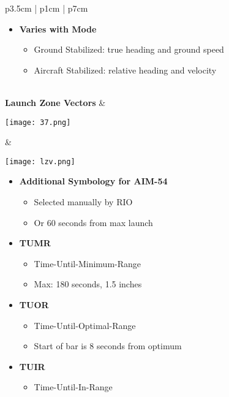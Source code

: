 \documentclass[8pt,usenames,dvipsnames,twoside]{article}
\begin{document}
\begin{center}
\begin{longtable}{p{3.5cm} | p{1cm} | p{7cm}}
\begin{minipage}[t]{\linewidth}
\begin{itemize}
						\item \textbf{Varies with Mode}
						\begin{itemize}
							\item Ground Stabilized: true heading and ground speed
							\item Aircraft Stabilized: relative heading and velocity
						\end{itemize}
					\end{itemize}
				\end{minipage} \\
				\midrule
				\textbf{Launch Zone Vectors} &
				\begin{minipage}[t]{\linewidth}
					\vspace{-7pt}
					\centering
					\texttt{[image: 37.png]}
				\end{minipage} &  
				\begin{minipage}[t]{\linewidth}
					\vspace{-7pt}
					\centering
					\texttt{[image: lzv.png]}
				\end{minipage}
				\begin{minipage}[t]{\linewidth}
					\begin{itemize}
						\item \textbf{Additional Symbology for AIM-54}
						\begin{itemize}
							\item Selected manually by RIO
							\item Or 60 seconds from max launch
						\end{itemize}
						\item \textbf{TUMR}
						\begin{itemize}
							\item Time-Until-Minimum-Range
							\item Max: 180 seconds, 1.5 inches
						\end{itemize}
						\item \textbf{TUOR}
						\begin{itemize}
							\item Time-Until-Optimal-Range
							\item Start of bar is 8 seconds from optimum
						\end{itemize}
						\item \textbf{TUIR}
						\begin{itemize}
							\item Time-Until-In-Range
						\end{itemize}

\end{itemize}
\end{minipage}
\end{longtable}
\end{center}
\end{document}
